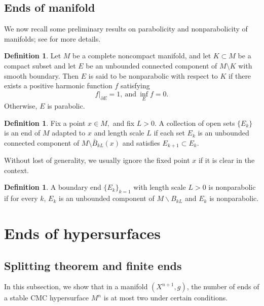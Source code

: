 \documentclass[11pt,letterpaper]{amsart}
\theoremstyle{definition}
\newtheorem{definition}[theorem]{Definition}
\theoremstyle{remark}
\numberwithin{equation}{section}
\begin{document}
\subsection{Ends of manifold}
We now recall some preliminary results on parabolicity and nonparabolicity of manifolds; see \cite{Li-Geometric-analysis} for more details. 
\begin{definition}
    Let $M$ be a complete noncompact manifold, and let $K\subset M$ be a compact subset and let $E$ be an unbounded connected component of $M\setminus K$ with smooth boundary. Then $E$ is said to be nonparabolic with respect to $K$ if there exists a positive harmonic function $f$ satisfying 
    \[f|_{\partial E}=1,\ \text{and}\ \inf_E f=0.\]
    Otherwise, $E$ is parabolic.
\end{definition}
\begin{definition}
    Fix a point $x\in M,$ and fix $L>0.$ A collection of open sets $\{E_k\}$ is an end of $M$ adapted to $x$ and length scale $L$ if each set $E_k$ is an unbounded connected component of $M\setminus \bar{B}_{kL}(x)$ and satisfies $E_{k+1}\subset E_k.$
\end{definition}
Without lost of generality, we usually ignore the fixed point $x$ if it is clear in the context.
\begin{definition}
    A boundary end $\{E_k\}_{k=1}$ with length scale $L>0$ is nonparabolic if for every $k$, $E_k$ is an unbounded component of $M\backslash B_{kL}$ and $E_k$ is nonparabolic.
\end{definition}



\section{Ends of hypersurfaces} 

\subsection{Splitting theorem and finite ends}
In this subsection,  we show that in a manifold $(X^{n+1},g)$, the number of ends of a stable CMC hypersurface $M^n$ is at most two under certain conditions. 
\end{document}
